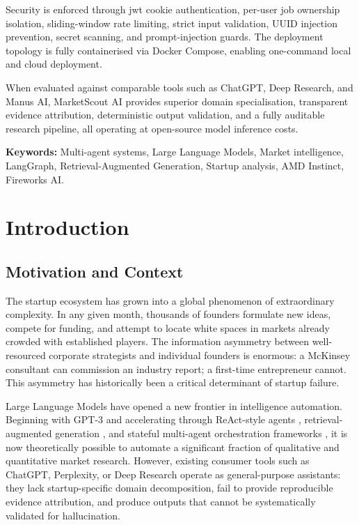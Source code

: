 \documentclass[12pt,a4paper,oneside]{book}
\begin{document}
Security is enforced through \gls{jwt} cookie authentication, per-user job ownership isolation, sliding-window rate limiting, strict input validation, UUID injection prevention, secret scanning, and prompt-injection guards. The deployment topology is fully containerised via Docker Compose, enabling one-command local and cloud deployment.

When evaluated against comparable tools such as ChatGPT, Deep Research, and Manus AI, MarketScout AI provides superior domain specialisation, transparent evidence attribution, deterministic output validation, and a fully auditable research pipeline, all operating at open-source model inference costs.

\textbf{Keywords:} Multi-agent systems, Large Language Models, Market intelligence, LangGraph, Retrieval-Augmented Generation, Startup analysis, AMD Instinct, Fireworks AI.

\tableofcontents
\listoffigures
\listoftables
\printglossary[type=\acronymtype, title=Acronyms]

\mainmatter

\chapter{Introduction}
\label{chap:introduction}

\section{Motivation and Context}

The startup ecosystem has grown into a global phenomenon of extraordinary complexity. In any given month, thousands of founders formulate new ideas, compete for funding, and attempt to locate white spaces in markets already crowded with established players. The information asymmetry between well-resourced corporate strategists and individual founders is enormous: a McKinsey consultant can commission an industry report; a first-time entrepreneur cannot. This asymmetry has historically been a critical determinant of startup failure.

Large Language Models have opened a new frontier in intelligence automation. Beginning with GPT-3 \cite{wooldridge1995intelligent} and accelerating through ReAct-style agents \cite{yao2023react}, retrieval-augmented generation \cite{lewis2020retrieval}, and stateful multi-agent orchestration frameworks \cite{langgraph2024}, it is now theoretically possible to automate a significant fraction of qualitative and quantitative market research. However, existing consumer tools such as ChatGPT, Perplexity, or Deep Research operate as general-purpose assistants: they lack startup-specific domain decomposition, fail to provide reproducible evidence attribution, and produce outputs that cannot be systematically validated for hallucination.
\end{document}
